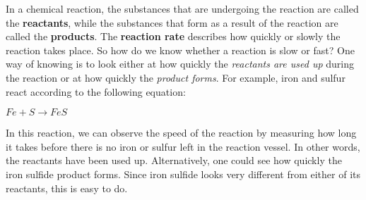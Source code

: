 
In a chemical reaction, the substances that are undergoing the reaction are called the \textbf{reactants}, while the substances that form as a result of the reaction are called the \textbf{products}. The \textbf{reaction rate} describes how quickly or slowly the reaction takes place. So how do we know whether a reaction is slow or fast? One way of knowing is to look either at how quickly the \textit{reactants are used up} during the reaction or at how quickly the \textit{product forms}. For example, iron and sulfur react according to the following equation:

\begin{center}
\rm${Fe + S \rightarrow FeS}$
\end{center}

In this reaction, we can observe the speed of the reaction by measuring how long it takes before there is no iron or sulfur left in the reaction vessel. In other words, the reactants have been used up. Alternatively, one could see how quickly the iron sulfide product forms. Since iron sulfide looks very different from either of its reactants, this is easy to do. \\

